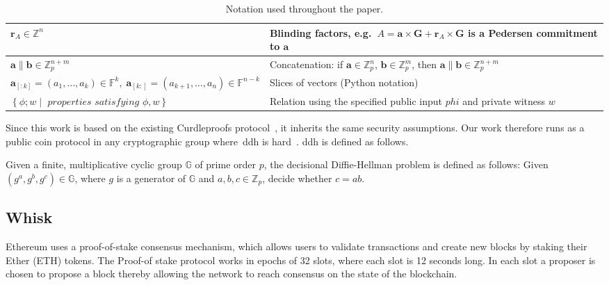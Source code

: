 \begin{table*}[!htb]
\begin{tabular}{|l|l|}
        \hline
        $\mathbf{r}_A\in\mathbb{Z}^n$ & Blinding factors, e.g.\ $A=\mathbf{a}\times\mathbf{G} + \mathbf{r}_A \times \mathbf{G}$ is a Pedersen commitment to $\mathbf{a}$ \\
        \hline
        $\mathbf{a}\parallel \mathbf{b}\in\mathbb{Z}_p^{n+m}$
        & Concatenation: if $\mathbf{a}\in\mathbb{Z}_p^n$, $\mathbf{b}\in\mathbb{Z}_p^m$, then $\mathbf{a}\parallel \mathbf{b}\in\mathbb{Z}_p^{n+m}$ \\
        \hline
        $\mathbf{a}_{[:k]}=(a_1,\dots,a_k)\in\mathbb{F}^k, \; \mathbf{a}_{[k:]}=(a_{k+1},\dots,a_n)\in\mathbb{F}^{n-k}$
        & Slices of vectors (Python notation) \\
        \hline
        $\left\{\phi; w\middle|\textit{ properties satisfying }\phi,w\right\}$
        & Relation using the specified public input $phi$ and private witness $w$ \\
        \hline
    \end{tabular}
    \caption{Notation used throughout the paper.}
    \label{tab:notation}
\end{table*}


Since this work is based on the existing Curdleproofs protocol~\cite{Curdleproofs}, it inherits the same security assumptions.
Our work therefore runs as a public coin protocol in any cryptographic group where~\gls{ddh} is hard~\cite{10.1007/BFb0054851}.
\gls{ddh} is defined as follows.

\begin{definition}[DDH]
 Given a finite, multiplicative cyclic group $\mathbb{G}$ of prime order $p$, the decisional Diffie-Hellman problem is defined as follows: Given $(g^a,g^b,g^c)\in\mathbb{G}$, where $g$ is a generator of $\mathbb{G}$ and $a,b,c\in\mathbb{Z}_p$, decide whether $c=ab$.
\end{definition}

\subsection{Whisk}\label{subsec:related-work-whisk}
Ethereum uses a proof-of-stake consensus mechanism, which allows users to validate transactions and create new blocks by staking their Ether (ETH) tokens.
The Proof-of stake protocol works in epochs of 32 slots, where each slot is 12 seconds long.
In each slot a proposer is chosen to propose a block thereby allowing the network to reach consensus on the state of the blockchain.

